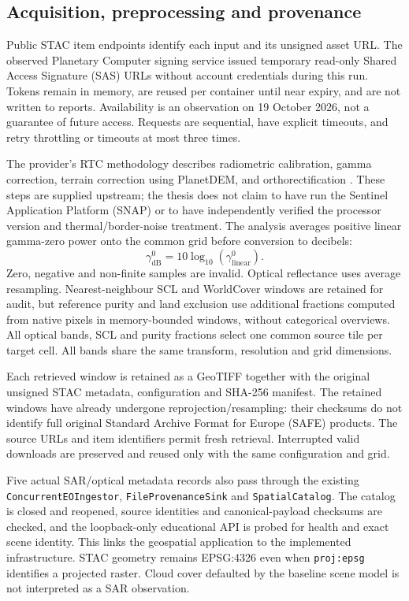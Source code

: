 \subsection{Acquisition, preprocessing and provenance}

Public STAC item endpoints identify each input and its unsigned asset URL. The observed
Planetary Computer signing service issued temporary read-only Shared Access Signature (SAS) URLs without account
credentials during this run. Tokens remain in memory, are reused per container until near
expiry, and are not written to reports. Availability is an observation on 19 October 2026,
not a guarantee of future access. Requests are sequential, have explicit timeouts, and
retry throttling or timeouts at most three times.

The provider's RTC methodology describes radiometric calibration, gamma correction,
terrain correction using PlanetDEM, and orthorectification \citep{pc-s1-rtc,small2011}.
These steps are supplied upstream; the thesis does not claim to have run the Sentinel
Application Platform (SNAP) or to
have independently verified the processor version and thermal/border-noise treatment.
The analysis averages positive linear gamma-zero power onto the common grid before
conversion to decibels:
\[
  \gamma^0_{\mathrm{dB}}=10\log_{10}(\gamma^0_{\mathrm{linear}}).
\]
Zero, negative and non-finite samples are invalid. Optical reflectance uses average
resampling. Nearest-neighbour SCL and WorldCover windows are retained for audit, but
reference purity and land exclusion use additional fractions computed from native pixels
in memory-bounded windows, without categorical overviews. All optical bands, SCL and purity
fractions select one common source tile per target cell. All bands share the same transform,
resolution and grid dimensions.

Each retrieved window is retained as a GeoTIFF together with the original unsigned STAC
metadata, configuration and SHA-256 manifest. The retained windows have already undergone
reprojection/resampling: their checksums do not identify full original Standard Archive Format
for Europe (SAFE) products.
The source URLs and item identifiers permit fresh retrieval. Interrupted valid downloads
are preserved and reused only with the same configuration and grid.

Five actual SAR/optical metadata records also pass through the existing
\nolinkurl{ConcurrentEOIngestor}, \nolinkurl{FileProvenanceSink} and
\nolinkurl{SpatialCatalog}.
The catalog is closed and reopened, source identities and canonical-payload checksums
are checked, and the loopback-only educational API is probed for health and exact scene
identity. This links the geospatial application to the implemented infrastructure.
STAC geometry remains EPSG:4326 even when \texttt{proj:epsg} identifies a projected raster.
Cloud cover defaulted by the baseline scene model is not interpreted as a SAR observation.

